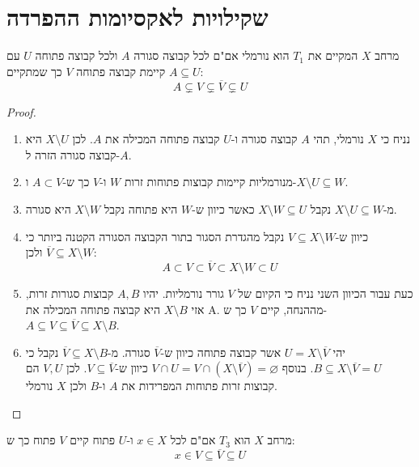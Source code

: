 \documentclass{tstextbook}
\begin{document}
\section{שקילויות לאקסיומות ההפרדה}

\begin{proposition}
מרחב \(X\) המקיים את \(T_{1}\) הוא נורמלי אם"ם לכל קבוצה סגורה \(A\) ולכל קבוצה פתוחה \(U\) עם \(A\subseteq U\) קיימת קבוצה פתוחה \(V\) כך שמתקיים:
$$A\subsetneq V\subsetneq \overline{V} \subsetneq U$$

\end{proposition}
\begin{proof}
  \begin{enumerate}
    \item נניח כי \(X\) נורמלי, תהי \(A\) קבוצה סגורה ו-\(U\) קבוצה פתוחה המכילה את \(A\). לכן \(X\setminus U\) היא קבוצה סגורה הזרה ל-\(A\). 


    \item מנורמליות קיימות קבוצות פתוחות זרות \(W\) ו-\(V\) כך ש-\(A \subset V\) ו-\(X \setminus U \subseteq W\). 


    \item מ-\(X\setminus U \subseteq W\) נקבל \(X\setminus W\subseteq U\) כאשר כיוון ש-\(W\) היא פתוחה נקבל \(X\setminus W\) היא סגורה. 


    \item כיוון ש-\(V\subseteq X\setminus W\) נקבל מהגדרת הסגור בתור הקבוצה הסגורה הקטנה ביותר כי \(\overline{V}\subseteq X\setminus W\) ולכן: 
$${ A}\subset V\subset{\overline{{V}}}\subset X\setminus W\subset U$$


    \item כעת עבור הכיוון השני נניח כי הקיום של \(V\) גורר נורמליות. יהיו \(A,B\) קבוצות סגורות זרות, אזי \(X\setminus B\) היא קבוצה פתוחה המכילה את A. מההנחה, קיים \(V\) כך ש-\(A\subseteq V\subseteq \overline{ V}\subseteq X\setminus B\).  


    \item יהי \(U=X \setminus \overline{V}\) אשר קבוצה פתוחה כיוון ש-\(\overline{ V}\) סגורה. מ-\(\overline{V}\subseteq X \setminus B\) נקבל כי \(B\subseteq X\setminus \overline{ V}=U\). בנוסף \(V\cap U = V\cap(X \setminus \overline{ V})=\varnothing\) כיוון ש-\(V\subseteq \overline{ V}\). לכן \(V,U\) הם קבוצות זרות פתוחות המפרידות את \(A\) ו-\(B\) ולכן \(X\) נורמלי. 


  \end{enumerate}
\end{proof}
\begin{proposition}
מרחב \(X\) הוא \(T_{3}\) אם"ם לכל \(x \in X\) ו-\(U\) פתוח קיים \(V\) פתוח כך ש:
$$x \in V\subseteq \overline{V} \subseteq U$$

\end{proposition}
\end{document}
